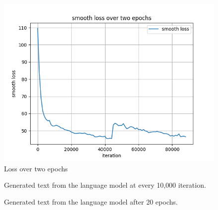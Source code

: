 \documentclass[12pt, a4paper]{article}
\begin{document}
\begin{figure}[H]
    \includegraphics{smooth_loss.png}
    \caption{Loss over two epochs}
    \label{fig:loss}
\end{figure}

\begin{figure}[H]
    \centering
    \begin{adjustbox}{minipage=1.1\textwidth,fbox}
        {\scriptsize
            
        }
    \end{adjustbox}
    \caption{Generated text from the language model at every 10,000 iteration. }
    \label{fig:evolution}
\end{figure}

\begin{figure}[H]
    \centering
    \begin{adjustbox}{minipage=\textwidth,fbox}
        {\scriptsize

            
        }
    \end{adjustbox}
    \caption{Generated text from the language model after 20 epochs.  }
    \label{fig:20epochs}
\end{figure}
\end{document}

